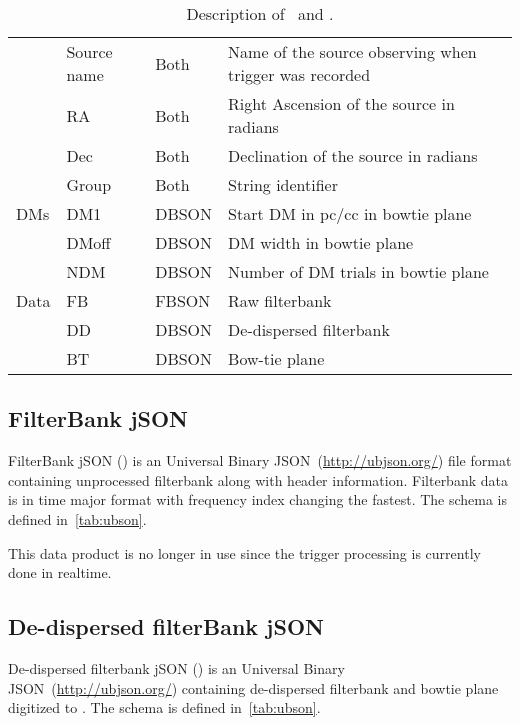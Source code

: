 \begin{table}
\begin{tabular}{llll}
																	& Source name & Both    & Name of the source observing when trigger was recorded \\
																	& RA          & Both    & Right Ascension of the source in radians               \\
																	& Dec         & Both    & Declination of the source in radians                   \\
																	& Group       & Both    & String identifier                                      \\ \midrule
		DMs                         & DM1         & DBSON   & Start DM in pc/cc in bowtie plane                      \\
																& DMoff       & DBSON   & DM width in bowtie plane                               \\
																& NDM         & DBSON   & Number of DM trials in bowtie plane                    \\ \midrule
		Data                        & FB          & FBSON   & Raw filterbank                                         \\
																& DD          & DBSON   & De-dispersed filterbank                                \\
																& BT          & DBSON   & Bow-tie plane                                          \\ \bottomrule
	\end{tabular}
	\caption {Description of \fbson~and \dbson. }
\end{table}
\subsection {FilterBank jSON}
\par FilterBank jSON (\fbson) is an Universal Binary JSON~(\url{http://ubjson.org/}) file format containing unprocessed filterbank along with header information. Filterbank data is in time major format with frequency index changing the fastest.
The schema is defined in~\autoref{tab:ubson}. 
\par This data product is no longer in use since the trigger processing is currently done in realtime.
\subsection {De-dispersed filterBank jSON}
\label{ssub:dbson}
\par De-dispersed filterbank jSON (\dbson) is an Universal Binary JSON~(\url{http://ubjson.org/}) containing de-dispersed filterbank and bowtie plane digitized to \uchar.
The schema is defined in~\autoref{tab:ubson}.
